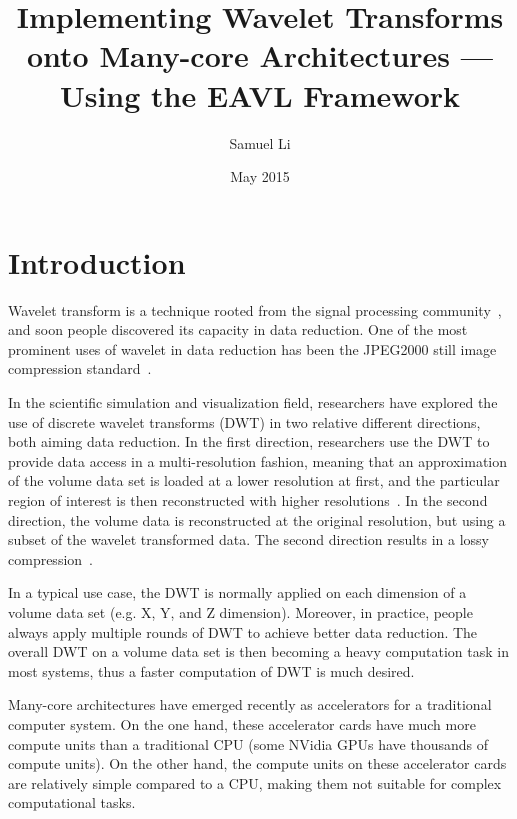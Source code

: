 \documentclass{article}
\title{Implementing Wavelet Transforms onto Many-core Architectures ---
        Using the EAVL Framework}
\author{Samuel Li}
\date{May 2015}
\begin{document}
\maketitle


\section{Introduction}
\label{sec:intro}
%
Wavelet transform is a technique rooted from the signal processing 
community~\cite{daubechies1990wavelet, mallat1999wavelet},
and soon people discovered its capacity in data reduction.
%
One of the most prominent uses of wavelet in data reduction has been
the JPEG2000 still image compression
standard~\cite{adams2001jpeg,usevitch2001tutorial}. 

In the scientific simulation and visualization field, researchers have
explored the use of discrete wavelet transforms (DWT) in two 
relative different directions, both aiming data reduction.
%
In the first direction, researchers use the DWT to provide data access
in a multi-resolution fashion, meaning that an approximation of the volume data
set is loaded at a lower resolution at first, and the particular region of interest
is then reconstructed with higher resolutions~\cite{mallat1989theory,
kanai1998digital, baldwin2003multi}.
%
In the second direction, the volume data is reconstructed at the 
original resolution, but using a subset of the wavelet transformed 
data.
%
The second direction results in a lossy compression~\cite{bethel2012high,
norton2012vapor}.

In a typical use case, the DWT is normally applied on each dimension of a
volume data set (e.g. X, Y, and Z dimension). 
%
Moreover, in practice, people always apply multiple rounds of DWT to achieve better
data reduction. 
%
The overall DWT on a volume data set is then becoming a heavy computation
task in most systems, thus a faster computation of DWT is much desired. 

Many-core architectures have emerged recently as accelerators for a 
traditional computer system.
%
On the one hand, these accelerator cards have much more compute units 
than a traditional CPU (some NVidia GPUs have thousands of compute units).
%
On the other hand, the compute units on these accelerator cards are 
relatively simple compared to a CPU, making them not suitable for complex 
computational tasks.
\end{document}
